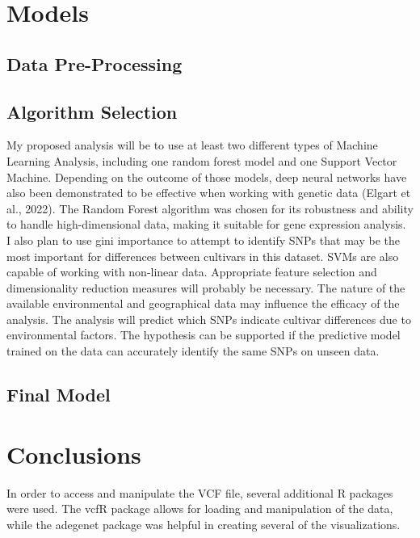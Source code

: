 \documentclass[
]{article}
\begin{document}
\section{Models}\label{models}

\subsection{Data Pre-Processing}\label{data-pre-processing}

\subsection{Algorithm Selection}\label{algorithm-selection}

My proposed analysis will be to use at least two different types of
Machine Learning Analysis, including one random forest model and one
Support Vector Machine. Depending on the outcome of those models, deep
neural networks have also been demonstrated to be effective when working
with genetic data (Elgart et al., 2022). The Random Forest algorithm was
chosen for its robustness and ability to handle high-dimensional data,
making it suitable for gene expression analysis. I also plan to use gini
importance to attempt to identify SNPs that may be the most important
for differences between cultivars in this dataset. SVMs are also capable
of working with non-linear data. Appropriate feature selection and
dimensionality reduction measures will probably be necessary. The nature
of the available environmental and geographical data may influence the
efficacy of the analysis. The analysis will predict which SNPs indicate
cultivar differences due to environmental factors. The hypothesis can be
supported if the predictive model trained on the data can accurately
identify the same SNPs on unseen data.

\subsection{Final Model}\label{final-model}

\section{Conclusions}\label{conclusions}

In order to access and manipulate the VCF file, several additional R
packages were used. The vcfR package allows for loading and manipulation
of the data, while the adegenet package was helpful in creating several
of the visualizations.
\end{document}
